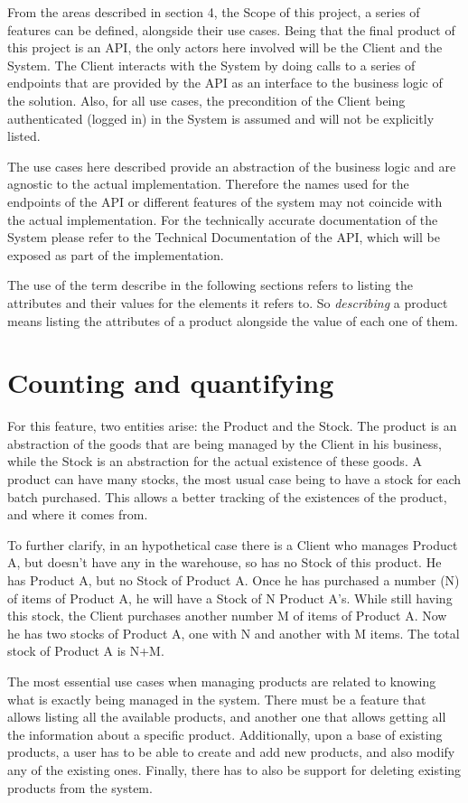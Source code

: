 From the areas described in section 4, the Scope of this project, a series of features can be defined, alongside their use cases. Being that the final product of this project is an API, the only actors here involved will be the Client and the System. The Client interacts with the System by doing calls to a series of endpoints that are provided by the API as an interface to the business logic of the solution. Also, for all use cases, the precondition of the Client being authenticated (logged in) in the System is assumed and will not be explicitly listed.

The use cases here described provide an abstraction of the business logic and are agnostic to the actual implementation. Therefore the names used for the endpoints of the API or different features of the system may not coincide with the actual implementation. For the technically accurate documentation of the System please refer to the Technical Documentation of the API, which will be exposed as part of the implementation.

The use of the term describe in the following sections refers to listing the attributes and their values for the elements it refers to. So \textit{describing} a product means listing the attributes of a product alongside the value of each one of them.

\section{Counting and quantifying}
For this feature, two entities arise: the Product and the Stock. The product is an abstraction of the goods that are being managed by the Client in his business, while the Stock is an abstraction for the actual existence of these goods. A product can have many stocks, the most usual case being to have a stock for each batch purchased. This allows a better tracking of the existences of the product, and where it comes from.

To further clarify, in an hypothetical case there is a Client who manages Product A, but doesn’t have any in the warehouse, so has no Stock of this product. He has Product A, but no Stock of Product A. Once he has purchased a number (N) of items of Product A, he will have a Stock of N Product A’s. While still having this stock, the Client purchases another number M of items of Product A. Now he has two stocks of Product A, one with N and another with M items. The total stock of Product A is N+M.

The most essential use cases when managing products are related to knowing what is exactly being managed in the system. There must be a feature that allows listing all the available products, and another one that allows getting all the information about a specific product. Additionally, upon a base of existing products, a user has to be able to create and add new products, and also modify any of the existing ones. Finally, there has to also be support for deleting existing products from the system.

